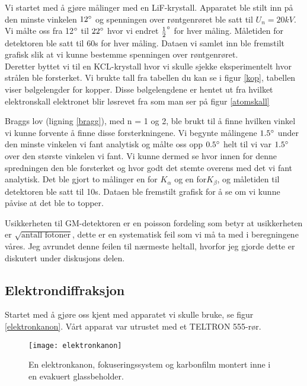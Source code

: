 \documentclass[norsk,a4paper,12pt]{article}
\begin{document}
Vi startet med å gjøre målinger med en LiF-krystall. Apparatet ble stilt inn på den minste vinkelen $12\degree$ og spenningen over røntgenrøret ble satt til $U_n = 20kV$. Vi målte oss fra 12$\degree$ til $22\degree$ hvor vi endret $\frac{1}{2}\degree$ for hver måling. Måletiden for detektoren ble satt til 60s for hver måling. Dataen vi samlet inn ble fremstilt grafisk slik at vi kunne bestemme spenningen over røntgenrøret. \\

Deretter byttet vi til en KCL-krystall hvor vi skulle sjekke eksperimentelt hvor strålen ble forsterket. Vi brukte tall fra tabellen du kan se i figur \vref{kop}, tabellen viser bølgelengder for kopper. Disse bølgelengdene er hentet ut fra hvilket elektronskall elektronet blir løsrevet fra som man ser på figur \vref{atomskall}

Braggs lov (ligning \ref{bragg}), med n = 1 og 2, ble brukt til å finne hvilken vinkel vi kunne forvente å finne disse forsterkningene. Vi begynte målingene $1.5\degree$ under den minste vinkelen vi fant analytisk og målte oss opp $0.5\degree$ helt til vi var $1.5\degree$ over den største vinkelen vi fant. Vi kunne dermed se hvor innen for denne spredningen den ble forsterket og hvor godt det stemte overens med det vi fant analytisk. Det ble gjort to målinger en for $K_\alpha$ og en for$K_\beta$, og måletiden til detektoren ble satt til 10s. Dataen ble fremstilt grafisk for å se om vi kunne påvise at det ble to topper. 

Usikkerheten til GM-detektoren er en poisson fordeling \cite{grl} som betyr at usikkerheten er $\sqrt{\text{antall fotoner}}$, dette er en systematisk feil som vi må ta med i beregningene våres. Jeg avrundet denne feilen til nærmeste heltall, hvorfor jeg gjorde dette er diskutert under diskusjons delen.

\subsection{Elektrondiffraksjon}
Startet med å gjøre oss kjent med apparatet vi skulle bruke, se figur \vref{elektronkanon}.
Vårt apparat var utrustet med et TELTRON 555-rør.
\begin{figure}[h!]
	\begin{center}
  	\texttt{[image: elektronkanon]}\\
	\caption[Bilde av elektronkanonen]{En elektronkanon, fokuseringssystem og karbonfilm montert inne i en evakuert glassbeholder.}
	\label{elektronkanon}
	\end{center}
\end{figure}
\end{document}
